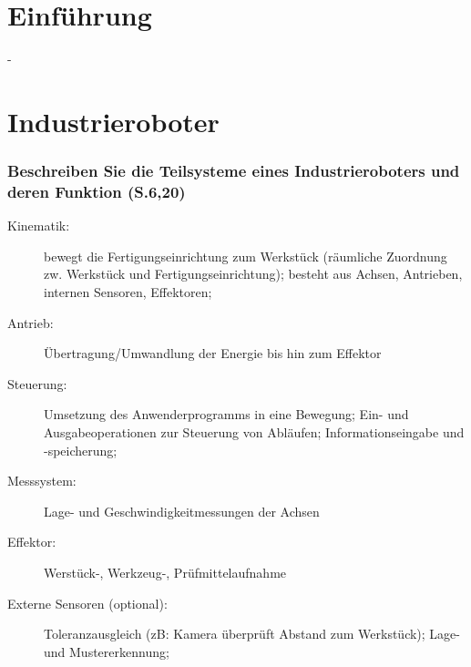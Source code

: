 \documentclass[12pt,a4paper,titlepage,oneside]{article}
\subtitle{Robotik und Automation in der KFZ-Elektronik}
\begin{document}
\maketitle

\section{Einführung}
-

\section{Industrieroboter}

\subsubsection*{Beschreiben Sie die Teilsysteme eines Industrieroboters und deren Funktion 
  (S.6,20)}
\begin{description}
\item[Kinematik:] bewegt die Fertigungseinrichtung zum Werkstück (räumliche Zuordnung zw. 
  Werkstück und Fertigungseinrichtung); besteht aus Achsen, Antrieben, internen Sensoren, 
  Effektoren;
\item[Antrieb:] Übertragung/Umwandlung der Energie bis hin zum Effektor
\item[Steuerung:] Umsetzung des Anwenderprogramms in eine Bewegung; Ein- und Ausgabeoperationen
  zur Steuerung von Abläufen; Informationseingabe und -speicherung;
\item[Messsystem:] Lage- und Geschwindigkeitmessungen der Achsen
\item[Effektor:] Werstück-, Werkzeug-, Prüfmittelaufnahme
\item[Externe Sensoren (optional):] Toleranzausgleich (zB: Kamera überprüft Abstand zum 
  Werkstück); Lage- und Mustererkennung; 
\end{description}
\end{document}
